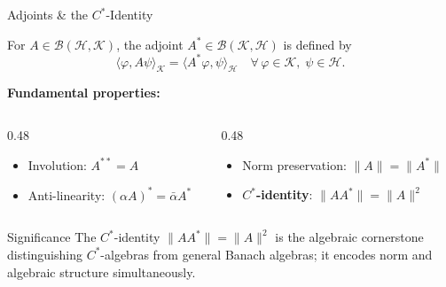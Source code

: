 \documentclass{beamer}
\newcommand{\Hilb}{\mathcal{H}}
\newcommand{\Bound}{\mathcal{B}}
\newcommand{\ip}[2]{\langle #1, #2 \rangle}
\newcommand{\norm}[1]{\|#1\|}
\begin{document}
\begin{frame}[shrink=10]{Adjoints \& the $C^*$-Identity}
  \small
  \begin{tcolorbox}[defbox, title={Adjoint}, left=3pt, right=3pt, top=2pt, bottom=2pt]
    For $A\in\Bound(\Hilb,\mathcal{K})$, the adjoint $A^*\in\Bound(\mathcal{K},\Hilb)$ is
    defined by
    \[
      \ip{\varphi}{A\psi}_{\mathcal K} = \ip{A^*\varphi}{\psi}_\Hilb
      \quad \forall\,\varphi\in\mathcal{K},\;\psi\in\Hilb.
    \]
  \end{tcolorbox}

  \vspace{0.2em}
  \textbf{Fundamental properties:}
  \begin{columns}[T]
    \begin{column}{0.48\textwidth}
      \begin{itemize}\setlength\itemsep{1pt}
        \item Involution: $A^{**}=A$
        \item Anti-linearity: $(\alpha A)^*=\bar\alpha A^*$
      \end{itemize}
    \end{column}
    \begin{column}{0.48\textwidth}
      \begin{itemize}\setlength\itemsep{1pt}
        \item Norm preservation: $\norm{A}=\norm{A^*}$
        \item $C^*$\textbf{-identity}: $\norm{AA^*}=\norm{A}^2$
      \end{itemize}
    \end{column}
  \end{columns}

  \vspace{0.2em}
  \begin{block}{Significance}
  \justifying
    The $C^*$-identity $\norm{AA^*}=\norm{A}^2$ is the algebraic cornerstone
    distinguishing $C^*$-algebras from general Banach algebras; it encodes
    norm and algebraic structure simultaneously.
  \end{block}
\end{frame}
\end{document}
